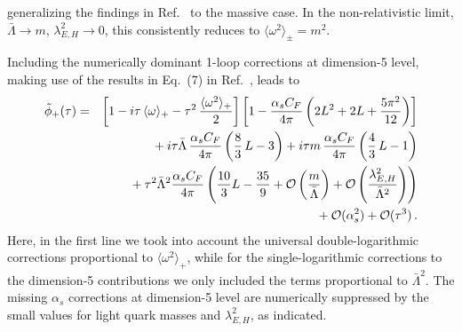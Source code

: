 \documentclass[a4paper,11pt]{article}
\begin{document}
generalizing the findings in Ref.~\cite{Grozin:1996pq} to the massive case.
In the non-relativistic limit, $\bar\Lambda \to m$, $\lambda_{E,H}^2 \to 0$, this consistently reduces to
$\langle \omega^2\rangle_\pm = m^2$.


Including the numerically dominant 1-loop corrections at dimension-5 level, making use of the results in Eq.~(7) in Ref.~\cite{Kawamura:2008vq}, leads to
\begin{eqnarray}
    \tilde\phi_+(\tau) &=& 
    \left[1- i \tau \, \langle\omega\rangle_+  
    - \tau^2 \, \frac{\langle \omega^2\rangle_+}{2} \right]\left[  1 - \frac{\alpha_s C_F}{4\pi} \left( 2 L^2+2 L + \frac{5\pi^2}{12} \right) \right]
    \cr 
    && {} + i \tau \bar\Lambda \, \frac{\alpha_s C_F}{4\pi} \left( \frac83 \, L -3 \right) 
      + i \tau m \, \frac{\alpha_s C_F}{4\pi} \left( \frac43 \, L - 1 \right) 
      \cr 
    && {} +  \tau^2 \bar{\Lambda}^2
        \frac{\alpha_s C_F}{4\pi} 
        \left( \frac{10}{3}L-\frac{35}{9} 
         + {\cal O}\left(\frac{m}{\bar\Lambda} \right) + {\cal O}\left( \frac{\lambda_{E,H}^2}{\bar\Lambda^2} \right) \right) \cr
    && {}   + {\cal O}(\alpha_s^2) + {\cal O}(\tau^3) \,.
    \label{phitauexpdim5}
\end{eqnarray}
Here, in the first line we took into account the universal double-logarithmic corrections proportional to $\langle \omega^2\rangle_+$, while for the single-logarithmic 
corrections to the dimension-5 contributions we only included the terms proportional to $\bar\Lambda^2$. The missing $\alpha_s$ corrections at dimension-5 level are numerically 
suppressed by the small values for light quark masses and $\lambda_{E,H}^2$, as indicated.
\end{document}
